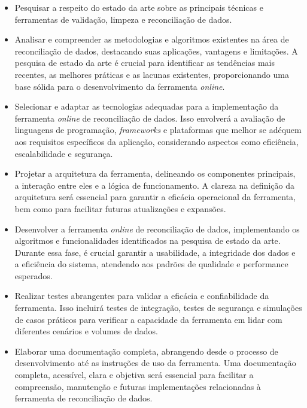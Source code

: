 \begin{itemize}

\item Pesquisar a respeito do estado da arte sobre as principais técnicas e ferramentas de validação, limpeza e reconciliação de dados. 

\item Analisar e compreender as metodologias e algoritmos existentes na área de reconciliação de dados, destacando suas aplicações, vantagens e limitações. A pesquisa de estado da arte é crucial para identificar as tendências mais recentes, as melhores práticas e as lacunas existentes, proporcionando uma base sólida para o desenvolvimento da ferramenta \textit{online}.

\item Selecionar e adaptar as tecnologias adequadas para a implementação da ferramenta \textit{online} de reconciliação de dados. Isso envolverá a avaliação de linguagens de programação, \textit{frameworks} e plataformas que melhor se adéquem aos requisitos específicos da aplicação, considerando aspectos como eficiência, escalabilidade e segurança.

\item Projetar a arquitetura da ferramenta, delineando os componentes principais, a interação entre eles e a lógica de funcionamento. A clareza na definição da arquitetura será essencial para garantir a eficácia operacional da ferramenta, bem como para facilitar futuras atualizações e expansões.

\item Desenvolver a ferramenta \textit{online} de reconciliação de dados, implementando os algoritmos e funcionalidades identificados na pesquisa de estado da arte. Durante essa fase, é crucial garantir a usabilidade, a integridade dos dados e a eficiência do sistema, atendendo aos padrões de qualidade e performance esperados.

\item Realizar testes abrangentes para validar a eficácia e confiabilidade da ferramenta. Isso incluirá testes de integração, testes de segurança e simulações de casos práticos para verificar a capacidade da ferramenta em lidar com diferentes cenários e volumes de dados.

\item Elaborar uma documentação completa, abrangendo desde o processo de desenvolvimento até as instruções de uso da ferramenta. Uma documentação completa, acessível, clara e objetiva será essencial para facilitar a compreensão, manutenção e futuras implementações relacionadas à ferramenta de reconciliação de dados.
\end{itemize}

